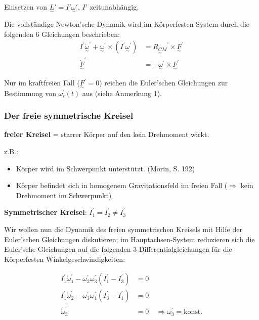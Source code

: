 \documentclass[10pt, letterpaper]{article}
\begin{document}
Einsetzen von $\underset{\sim}{L}' = I'\underset{\sim}{\omega}'$, $I'$ zeitunabhängig.




Die vollständige Newton'sche Dynamik wird im Körperfesten System durch die folgenden 6 Gleichungen beschrieben:
\begin{equation*}
\begin{aligned}
I^\prime \dot{\underset{\sim}{\omega}}^\prime + \underset{\sim}{\omega}^\prime \times (I^\prime \underset{\sim}{\omega}^\prime) &= \underset{\sim}{R_{CM}}^\prime \times \underset{\sim}{F}^\prime \\
\dot{\underset{\sim}{F}}^\prime &= -\underset{\sim}{\omega}^\prime \times \underset{\sim}{F}^\prime
\end{aligned}
\end{equation*}

Nur im kraftfreien Fall ($\underset{\sim}{F}^\prime = 0$) reichen die Euler'schen Gleichungen zur Bestimmung von $\omega_i^\prime(t)$ aus (siehe Anmerkung 1).


\pagebreak


\subsubsection{Der freie symmetrische Kreisel}

\textbf{freier Kreisel} = starrer Körper auf den kein Drehmoment wirkt.

z.B.: 
\begin{itemize}
\item Körper wird im Schwerpunkt unterstützt. (Morin, S. 192)
\item Körper befindet sich in homogenem Gravitationsfeld im freien Fall ($\Rightarrow$ kein Drehmoment im Schwerpunkt)
\end{itemize}

\textbf{Symmetrischer Kreisel}: $I_1^\prime = I_2^\prime \neq I_3^\prime$

Wir wollen nun die Dynamik des freien symmetrischen Kreisels mit Hilfe der Euler'schen Gleichungen diskutieren; im Hauptachsen-System reduzieren sich die Euler'sche Gleichungen auf die folgenden 3 Differentialgleichungen für die Körperfesten Winkelgeschwindigkeiten:

\begin{align*}
I_1^\prime \dot{\omega}_1^\prime - \omega_2^\prime \omega_3^\prime (I_1^\prime-I_3^\prime) &= 0 \\
I_1^\prime \dot{\omega}_2^\prime - \omega_3^\prime \omega_1^\prime (I_3^\prime-I_1^\prime) &= 0 \\
\dot{\omega}_3^\prime &= 0 \quad \Rightarrow \omega_3^\prime = \text{konst.}
\end{align*}
\end{document}
